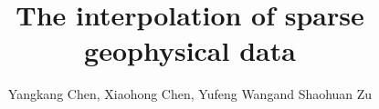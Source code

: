 \documentclass[preprint,amsmath,authoryear,12pt,manuscript]{elsarticle}
\DeclareRobustCommand{\dlo}[1]{}
\DeclareRobustCommand{\wen}[1]{#1}
\begin{document}
\begin{frontmatter}
\title{\dlo{Structural smoothness constrained sparse-data interpolation}\wen{The interpolation of sparse geophysical data}}
\renewcommand{\thefootnote}{\fnsymbol{footnote}}

\author{Yangkang Chen\footnotemark[1], Xiaohong Chen\footnotemark[2], Yufeng Wang\footnotemark[2] and Shaohuan Zu\footnotemark[2]}


\address{
\footnotemark[1]
School of Earth Sciences\\
Zhejiang University\\
Hangzhou, Zhejiang Province, China, 310027\\
chenyk2016@gmail.com \\
\footnotemark[2] State Key Laboratory of Petroleum Resources and Prospecting \\
China University of Petroleum \\
Fuxue Road 18th\\
Beijing, China, 102200 \\
chenxh@cup.edu \& hellowangyf@163.com \& zushaohuan@qq.com  \\
}






\end{frontmatter}
\end{document}
